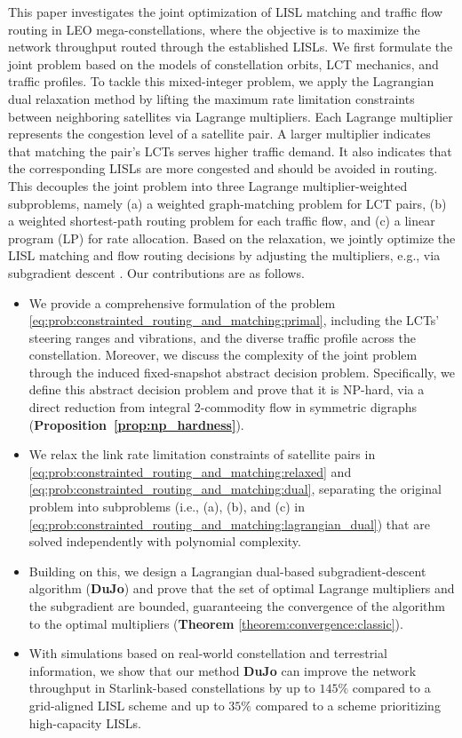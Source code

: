 \documentclass[journal]{IEEEtran}
\begin{document}
This paper investigates the joint optimization of LISL matching and traffic flow routing in LEO mega-constellations, where the objective is to maximize the network throughput routed through the established LISLs. We first formulate the joint problem based on the models of constellation orbits, LCT mechanics, and traffic profiles.
To tackle this mixed-integer problem, we apply the Lagrangian dual relaxation method by lifting the maximum rate limitation constraints between neighboring satellites via Lagrange multipliers.
Each Lagrange multiplier represents the congestion level of a satellite pair. A larger multiplier indicates that matching the pair's LCTs serves higher traffic demand. It also indicates that the corresponding LISLs are more congested and should be avoided in routing.
This decouples the joint problem into three Lagrange multiplier-weighted subproblems, namely (a) a weighted graph-matching problem for LCT pairs, (b) a weighted shortest-path routing problem for each traffic flow, and (c) a linear program (LP) for rate allocation.
Based on the relaxation, we jointly optimize the LISL matching and flow routing decisions by adjusting the multipliers, e.g., via subgradient descent \cite{boyd2003subgradient}.
Our contributions are as follows.
\begin{itemize}
  \item We provide a comprehensive formulation of the problem \eqref{eq:prob:constrainted_routing_and_matching:primal}, including the LCTs' steering ranges and vibrations, and the diverse traffic profile across the constellation. Moreover, we discuss the complexity of the joint problem through the induced fixed-snapshot abstract decision problem. Specifically, we define this abstract decision problem and prove that it is NP-hard, via a direct reduction from integral 2-commodity flow in symmetric digraphs \cite{jarry2012multiflows} (\textbf{Proposition~\ref{prop:np_hardness}}).
  \item We relax the link rate limitation constraints of satellite pairs in \eqref{eq:prob:constrainted_routing_and_matching:relaxed} and  \eqref{eq:prob:constrainted_routing_and_matching:dual}, separating the original problem into subproblems (i.e., (a), (b), and (c) in \eqref{eq:prob:constrainted_routing_and_matching:lagrangian_dual}) that are solved independently with polynomial complexity.
  \item Building on this, we design a Lagrangian dual-based subgradient-descent algorithm (\textbf{DuJo}) and prove that the set of optimal Lagrange multipliers and the subgradient are bounded, guaranteeing the convergence of the algorithm to the optimal multipliers (\textbf{Theorem} \ref{theorem:convergence:classic}).
  \item With simulations based on real-world constellation and terrestrial information, we show that our method \textbf{DuJo} can improve the network throughput in Starlink-based constellations by up to $145\%$ compared to a grid-aligned LISL scheme and up to $35\%$ compared to a scheme prioritizing high-capacity LISLs.
\end{itemize}
\end{document}

